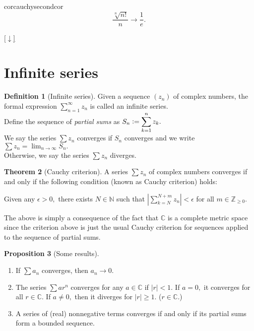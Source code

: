 \documentclass[12pt,oneside]{book}
\theoremstyle{definition}
\newtheorem{thm}{Theorem}
\numberwithin{thm}{chapter}
\newtheorem{defn}[thm]{Definition}
\newtheorem{prop}[thm]{Proposition}
\newcommand{\downsym}{[$\downarrow$]}
\begin{document}
\begin{restatable}[]{cor}{cauchysecondcor}
\label{cor:cauchysecondcor}
	\begin{equation*} 
		\dfrac{\sqrt[n]{n!}}{n} \to \dfrac{1}{e}.
	\end{equation*}
\end{restatable}
\begin{flushright}\hyperref[cor:cauchysecondcor2]{\downsym}\end{flushright}

\section{Infinite series}
\begin{defn}[Infinite series]
	Given a sequence $(z_n)$ of complex numbers, the formal expression $\displaystyle\sum_{n=1}^{\infty}z_n$ is called an infinite series. \\
	Define the sequence of \emph{partial sums} as $S_n \vcentcolon= \displaystyle\sum_{k=1}^{n}z_k.$\\
	We say the series $\sum z_n$ converges if $S_n$ converges and we write $\sum z_n = \displaystyle\lim_{n\to \infty}S_n.$\\
	Otherwise, we say the series $\sum z_n$ diverges.
\end{defn}


\begin{thm}[Cauchy criterion]\label{thm:cauchcrit}
	A series $\sum z_n$ of complex numbers converges if and only if the following condition (known as Cauchy criterion) holds:

	Given any $\epsilon > 0,$ there exists $N \in \mathbb{N}$ such that $\displaystyle\left|\sum_{k=N}^{N+m}z_n\right| < \epsilon$ for all $m \in \mathbb{Z}_{\ge 0}.$
\end{thm}
The above is simply a consequence of the fact that $\mathbb{C}$ is a complete metric space since the criterion above is just the usual Cauchy criterion for sequences applied to the sequence of partial sums.

\begin{prop}[Some results]\label{prop:res}
	\begin{enumerate}
		\item If $\sum a_n$ converges, then $a_n \to 0.$ \label{divergencetest}
		\item The series $\sum ar^n$ converges for any $a \in \mathbb{C}$ if $|r| < 1.$ If $a = 0,$ it converges for all $r \in \mathbb{C}.$ If $a \neq 0,$ then it diverges for $|r| \ge 1.$ ($r \in \mathbb{C}.$)
		\item A series of (real) nonnegative terms converges if and only if its partial sums form a bounded sequence.
	\end{enumerate}
\end{prop}
\end{document}
